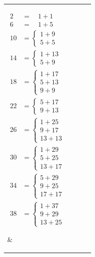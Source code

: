 \documentclass[12pt]{article}
\begin{document}
\begin{tabular}{l|l|l|l} 
\parbox[t]{0.2\linewidth}{%
  \vspace*{-\baselineskip}
    \begin{align*} 
        2 &= \quad \! 1 + 1 \\ 
        6 &= \quad \! 1 + 5 \\
        10 &= \begin{cases}
          1 + 9 \\ 5 + 5
        \end{cases} \\
        14 &= \begin{cases}
          1 + 13 \\ 5 + 9
        \end{cases} \\
        18 &= \begin{cases}
           1 + 17 \\ 5 + 13 \\ 9 + 9
        \end{cases} \\
        22 &= \begin{cases}
           5 + 17 \\ 9 + 13
        \end{cases} \\
        26 &= \begin{cases}
          1 + 25 \\ 9 + 17 \\ 13 + 13
        \end{cases} \\
        30 &= \begin{cases}
           1 + 29 \\ 5 + 25 \\ 13 + 17
        \end{cases} \\
        34 &= \begin{cases}
           5 + 29 \\ 9 + 25 \\ 17 + 17
        \end{cases} \\
        38 &= \begin{cases}
           1 + 37 \\ 9 + 29 \\ 13 + 25
        \end{cases} 
    \end{align*}} &  
\parbox[t]{0.2\linewidth}{%
    \vspace*{-\baselineskip}
}
\end{tabular}
\end{document}
